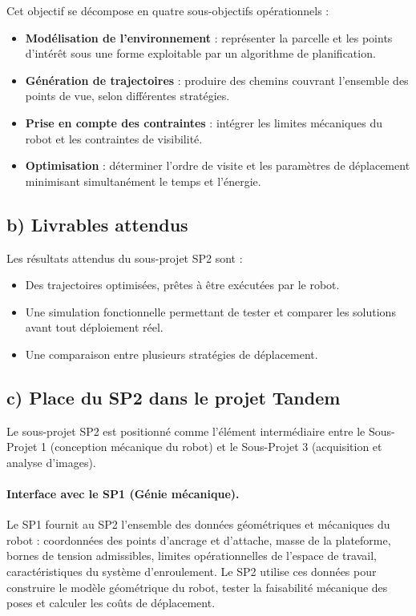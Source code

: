 Cet objectif se décompose en quatre sous-objectifs opérationnels :
\begin{itemize}
\item \textbf{Modélisation de l'environnement} : représenter la parcelle et les points d'intérêt sous une forme exploitable par un algorithme de planification.
\item \textbf{Génération de trajectoires} : produire des chemins couvrant l'ensemble des points de vue, selon différentes stratégies.
\item \textbf{Prise en compte des contraintes} : intégrer les limites mécaniques du robot et les contraintes de visibilité.
\item \textbf{Optimisation} : déterminer l'ordre de visite et les paramètres de déplacement minimisant simultanément le temps et l'énergie.
\end{itemize}

\subsection*{b) Livrables attendus}

Les résultats attendus du sous-projet SP2 sont :
\begin{itemize}
\item Des trajectoires optimisées, prêtes à être exécutées par le robot.
\item Une simulation fonctionnelle permettant de tester et comparer les solutions avant tout déploiement réel.
\item Une comparaison entre plusieurs stratégies de déplacement.
\end{itemize}

\subsection*{c) Place du SP2 dans le projet Tandem}

Le sous-projet SP2 est positionné comme l'élément intermédiaire entre le Sous-Projet 1 (conception mécanique du robot) et le Sous-Projet 3 (acquisition et analyse d'images).

\paragraph{Interface avec le SP1 (Génie mécanique).}
Le SP1 fournit au SP2 l'ensemble des données géométriques et mécaniques du robot : coordonnées des points d'ancrage et d'attache, masse de la plateforme, bornes de tension admissibles, limites opérationnelles de l'espace de travail, caractéristiques du système d'enroulement. Le SP2 utilise ces données pour construire le modèle géométrique du robot, tester la faisabilité mécanique des poses et calculer les coûts de déplacement.

